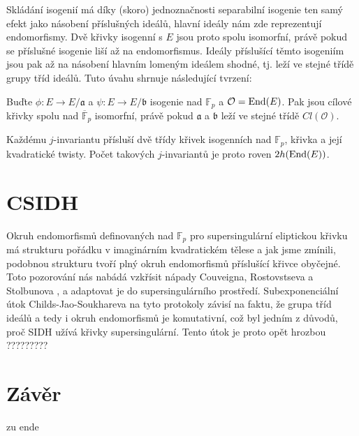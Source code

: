 \documentclass[12pt]{report}
\begin{document}
Skládání isogenií má díky (skoro) jednoznačnosti separabilní isogenie ten samý efekt jako násobení příslušných ideálů, hlavní ideály  nám zde reprezentují endomorfismy. Dvě křivky isogenní s $E$ jsou proto spolu isomorfní, právě pokud se příslušné isogenie liší až na endomorfismus.  Ideály příslušící těmto isogeniím jsou pak až na násobení hlavním lomeným ideálem shodné, tj. leží ve stejné třídě grupy tříd ideálů. Tuto úvahu shrnuje následující tvrzení:
\begin{veta}
Buďte $\phi : E \longrightarrow E/\mathfrak{a}$ a $\psi : E \longrightarrow E/\mathfrak{b}$ isogenie nad $\mathbb{F}_p$ a $\mathcal{O} = \operatorname{End}(E)$. Pak jsou cílové křivky spolu nad $\overline{\mathbb{F}}_p$ isomorfní, právě pokud $\mathfrak{a}$ a $\mathfrak{b}$ leží ve stejné třídě $Cl(\mathcal{O})$.
\end{veta}

Každému $j$-invariantu přísluší dvě třídy křivek isogenních nad $\mathbb{F}_p$, křivka a její kvadratické twisty. Počet takových $j$-invariantů je proto roven $2 h (\operatorname{End}(E))$.


\chapter{CSIDH}

Okruh endomorfismů definovaných nad $\mathbb{F}_p$ pro supersingulární eliptickou křivku má strukturu pořádku v imaginárním kvadratickém tělese a jak jsme zmínili, podobnou strukturu tvoří plný okruh endomorfismů příslušící křivce obyčejné. Toto pozorování nás nabádá vzkřísit nápady Couveigna, Rostovstseva a Stolbunova \cite{Couveignes}, \cite{Stolbunov} a adaptovat je do supersingulárního prostředí. Subexponenciální útok Childs-Jao-Soukhareva na tyto protokoly závisí na faktu, že grupa tříd ideálů a tedy i okruh endomorfismů je komutativní, což byl jedním z důvodů, proč SIDH užívá křivky supersingulární. Tento útok je proto opět hrozbou ?????????




\chapter*{Závěr}
zu ende


\end{document}
